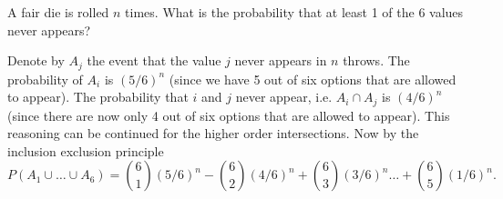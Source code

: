 
\setcounter{theorem}{23}
\begin{exercise}[BH.1.49]
	A fair die is rolled $n$ times. What is the probability that at least 1 of the 6 values never appears?
\begin{solution}
	Denote by $A_{j}$ the event that the value $j$ never appears in $n$ throws. The probability of $A_{i}$ is $(5/6)^n$ (since we have 5 out of six options that are allowed to appear). The probability that $i$ and $j$ never appear, i.e. $A_{i}\cap A_{j}$ is $(4/6)^n$ (since there are now only 4 out of six options that are allowed to appear). This reasoning can be continued for the higher order intersections. Now by the inclusion exclusion principle
	$$P(A_{1}\cup\ldots\cup A_{6}) = {6 \choose 1}(5/6)^n - {6 \choose 2}(4/6)^n + {6\choose 3}(3/6)^n\ldots +{6 \choose 5}(1/6)^n.$$ 
 
\end{solution}
\end{exercise}


